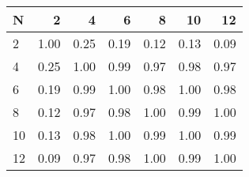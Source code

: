 \begin{tabular}{lrrrrrr}
\toprule
N &    2  &    4  &    6  &    8  &    10 &    12 \\
\midrule
2  &  1.00 &  0.25 &  0.19 &  0.12 &  0.13 &  0.09 \\
4  &  0.25 &  1.00 &  0.99 &  0.97 &  0.98 &  0.97 \\
6  &  0.19 &  0.99 &  1.00 &  0.98 &  1.00 &  0.98 \\
8  &  0.12 &  0.97 &  0.98 &  1.00 &  0.99 &  1.00 \\
10 &  0.13 &  0.98 &  1.00 &  0.99 &  1.00 &  0.99 \\
12 &  0.09 &  0.97 &  0.98 &  1.00 &  0.99 &  1.00 \\
\bottomrule
\end{tabular}
